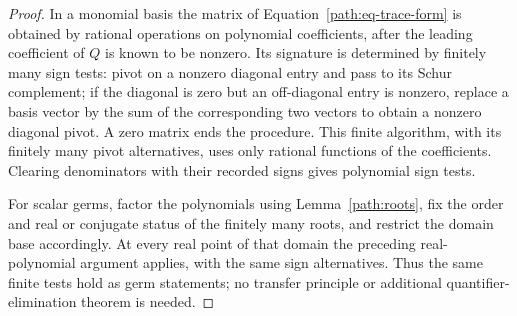 \begin{proof}
In a monomial basis the matrix of Equation~\eqref{path:eq-trace-form}
is obtained by rational operations on polynomial coefficients, after
the leading coefficient of \(Q\) is known to be nonzero.  Its signature
is determined by finitely many sign tests: pivot on a nonzero diagonal
entry and pass to its Schur complement; if the diagonal is zero but
an off-diagonal entry is nonzero, replace a basis vector by the sum
of the corresponding two vectors to obtain a nonzero diagonal pivot.
A zero matrix ends the procedure.  This finite algorithm, with its
finitely many pivot alternatives, uses only rational functions of
the coefficients.  Clearing denominators with their recorded signs
gives polynomial sign tests.

For scalar germs, factor the polynomials using Lemma~\ref{path:roots},
fix the order and real or conjugate status of the finitely many roots,
and restrict the domain base accordingly.  At every real point of
that domain the preceding real-polynomial argument applies, with the
same sign alternatives.  Thus the same finite tests hold as germ
statements; no transfer principle or additional quantifier-elimination
theorem is needed.
\end{proof}

